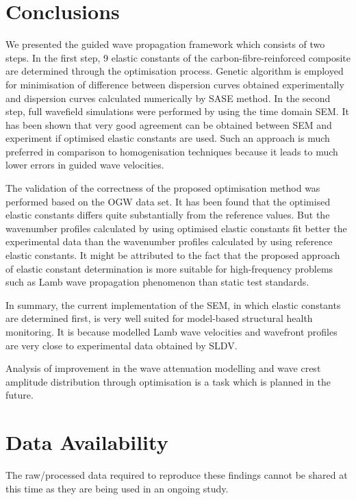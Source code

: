 \documentclass[preprint,12pt]{elsarticle}
\begin{document}
\section{Conclusions}
We presented the guided wave propagation framework which consists of two steps. 
In the first step, 9 elastic constants of the carbon-fibre-reinforced composite are determined through the optimisation process. 
Genetic algorithm is employed for minimisation of difference between dispersion curves obtained experimentally and dispersion curves calculated numerically by SASE method.
In the second step, full wavefield simulations were performed by using the time domain SEM. 
It has been shown that very good agreement can be obtained between SEM and experiment if optimised elastic constants are used. 
Such an approach is much preferred in comparison to homogenisation techniques because it leads to much lower errors in guided wave velocities.

The validation of the correctness of the proposed optimisation method was performed based on the OGW data set.
It has been found that the optimised elastic constants differs quite substantially from the reference values. 
But the wavenumber profiles calculated by using optimised elastic constants fit better the experimental data than the wavenumber profiles calculated by using reference elastic constants.
It might be attributed to the fact that the proposed approach of elastic constant determination is more suitable for high-frequency problems such as Lamb wave propagation phenomenon than static test standards.

In summary, the current implementation of the SEM, in which elastic constants are determined first, is very well suited for model-based structural health monitoring. 
It is because modelled Lamb wave velocities and wavefront profiles are very close to experimental data obtained by SLDV. 

Analysis of improvement in the wave attenuation modelling and wave crest amplitude distribution through optimisation is a task which is planned in the future.

\section*{Data Availability}
The raw/processed data required to reproduce these findings cannot
be shared at this time as they are being used in an ongoing study.
\end{document}
